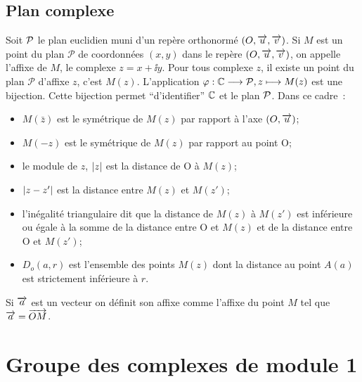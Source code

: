 \subsection{Plan complexe}
\label{subsec:plancomplexe}
Soit \(\P\) le plan euclidien muni d'un repère orthonormé \((O,\vect{u}, 
\vect{v})\). Si \(M\) est un point du plan \(\mathcal{P}\) de coordonnées 
\((x,y)\) dans le repère \((O,\vect{u}, \vect{v})\), on appelle l'affixe de 
\(M\), le complexe \(z=x + \ii y\). Pour tous complexe \(z\), il existe un point 
du plan \(\mathcal{P}\) d'affixe \(z\), c'est \(M(z)\). L'application 
\(\fonctionL{\varphi}{\C}{\P}{z}{M(z)}\) est une bijection. Cette bijection 
permet ``d'identifier'' \(\C\) et le plan \(\P\). Dans ce cadre~:
\begin{itemize}
    \item \(M(\bar{z})\) est le symétrique de \(M(z)\) par rapport à l'axe 
        \((O,\vect{u})\);
    \item \(M(-z)\) est le symétrique de \(M(z)\) par rapport au point O;
    \item le module de \(z\), \(\abs{z}\) est la distance de O à \(M(z)\);
    \item \(\abs{z-z'}\) est la distance entre \(M(z)\) et \(M(z')\);
    \item l'inégalité triangulaire dit que la distance de \(M(z)\) à \(M(z')\) 
        est inférieure ou égale à la somme de la distance entre O et \(M(z)\) et 
        de la distance entre O et \(M(z')\);
    \item \(D_o(a,r)\) est l'ensemble des points \(M(z)\) dont la distance au 
        point \(A(a)\) est strictement inférieure à \(r\).
\end{itemize}
Si \(\vect{a}\) est un vecteur on définit son affixe comme l'affixe du point 
\(M\) tel que \(\vect{a}=\vect{OM}\).
\section{Groupe des complexes de module 1}
\label{sec:groupeU}
